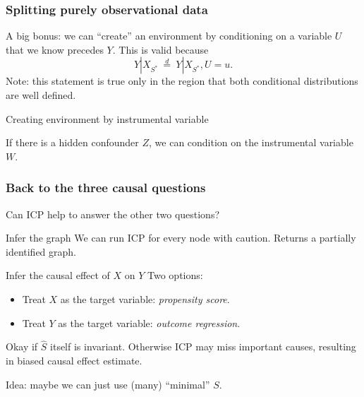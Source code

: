 \documentclass{beamer}
\begin{document}
\begin{frame}
  \frametitle{Splitting purely observational data}
  A big bonus: we can ``create'' an environment by conditioning on a
  variable $U$ that we know precedes $Y$. This is valid because
\[
Y|X_{S^{*}} ~\overset{d}{=}~ Y|X_{S^{*}},U=u.
\]
  Note: this statement is true only in the region that both
  conditional distributions are well defined.

  \begin{exampleblock}{Creating environment by instrumental variable}
    \begin{center}
    \end{center}
    If there is a hidden confounder $Z$, we can condition on the
    instrumental variable $W$.
  \end{exampleblock}
\end{frame}

\begin{frame}
  \frametitle{Back to the three causal questions}
  Can ICP help to answer the other two questions?
  \begin{block}{Infer the graph}
    We can run ICP for every node with caution. Returns a partially
    identified graph.
  \end{block}

  \begin{block}{Infer the causal effect of $X$ on $Y$}
    Two options:
    \begin{itemize}
    \item Treat $X$ as the target variable: \emph{propensity score}.
    \item Treat $Y$ as the target variable: \emph{outcome regression}.
    \end{itemize}
    Okay if $\hat{S}$ itself is invariant. Otherwise ICP may miss important causes, resulting
    in biased causal effect estimate.

    Idea: maybe we can just use (many) ``minimal'' $S$.
  \end{block}
\end{frame}
\end{document}
